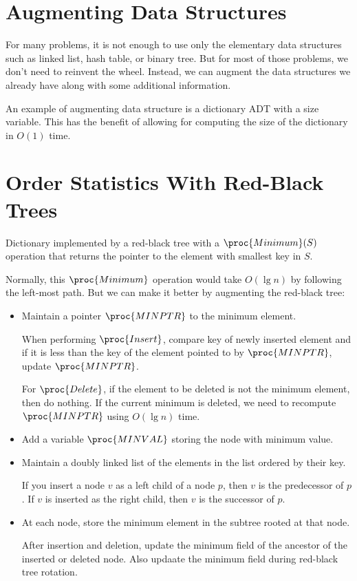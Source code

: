 \section{Augmenting Data Structures}

For many problems, it is not enough to use only the elementary data structures such as linked list, hash table, or binary tree. But for most of those problems, we don't need to reinvent the wheel. Instead, we can augment the data structures we already have along with some additional information.

An example of augmenting data structure is a dictionary ADT with a size variable. This has the benefit of allowing for computing the size of the dictionary in $O(1)$ time.

\section{Order Statistics With Red-Black Trees}

Dictionary implemented by a red-black tree with a $\proc{Minimum}(S)$ operation that returns the pointer to the element with smallest key in $S$.

Normally, this $\proc{Minimum}$ operation would take $O(\lg n)$ by following the left-most path. But we can make it better by augmenting the red-black tree:

\begin{itemize}
    \item Maintain a pointer $\proc{MINPTR}$ to the minimum element.
    
    When performing $\proc{Insert}$, compare key of newly inserted element and if it is less than the key of the element pointed to by $\proc{MINPTR}$, update $\proc{MINPTR}$.

    For $\proc{Delete}$, if the element to be deleted is not the minimum element, then do nothing. If the current minimum is deleted, we need to recompute $\proc{MINPTR}$ using $O(\lg n)$ time.

    \item Add a variable $\proc{MINVAL}$ storing the node with minimum value.
    \item Maintain a doubly linked list of the elements in the list ordered by their key.
    
    If you insert a node $v$ as a left child of a node $p$, then $v$ is the predecessor of $p$. If $v$ is inserted as the right child, then $v$ is the successor of $p$.

    \item At each node, store the minimum element in the subtree rooted at that node.
    
    After insertion and deletion, update the minimum field of the ancestor of the inserted or deleted node. Also updaate the minimum field during red-black tree rotation.
\end{itemize}

